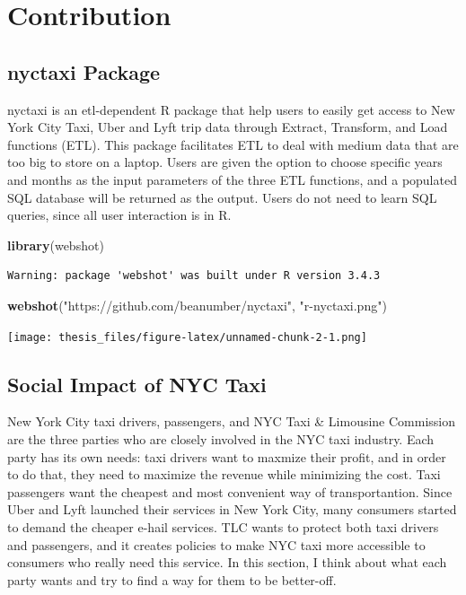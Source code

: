 \documentclass[12pt,twoside]{reedthesis}
\newenvironment{Shaded}{\begin{snugshade}}{\end{snugshade}}
\newcommand{\KeywordTok}[1]{\textcolor[rgb]{0.13,0.29,0.53}{\textbf{#1}}}
\newcommand{\StringTok}[1]{\textcolor[rgb]{0.31,0.60,0.02}{#1}}
\newcommand{\NormalTok}[1]{#1}
\theoremstyle{definition}
\theoremstyle{definition}
\theoremstyle{definition}
\theoremstyle{remark}
\begin{document}
\section{Contribution}\label{contribution}

\subsection{nyctaxi Package}\label{nyctaxi-package}

nyctaxi is an etl-dependent R package that help users to easily get
access to New York City Taxi, Uber and Lyft trip data through Extract,
Transform, and Load functions (ETL). This package facilitates ETL to
deal with medium data that are too big to store on a laptop. Users are
given the option to choose specific years and months as the input
parameters of the three ETL functions, and a populated SQL database will
be returned as the output. Users do not need to learn SQL queries, since
all user interaction is in R.
\begin{Shaded}
\begin{Highlighting}[]
\KeywordTok{library}\NormalTok{(webshot)}
\end{Highlighting}
\end{Shaded}
\begin{verbatim}
Warning: package 'webshot' was built under R version 3.4.3
\end{verbatim}
\begin{Shaded}
\begin{Highlighting}[]
\KeywordTok{webshot}\NormalTok{(}\StringTok{"https://github.com/beanumber/nyctaxi"}\NormalTok{, }\StringTok{"r-nyctaxi.png"}\NormalTok{)}
\end{Highlighting}
\end{Shaded}
\texttt{[image: thesis\_files/figure-latex/unnamed-chunk-2-1.png]}

\subsection{Social Impact of NYC Taxi}\label{social-impact-of-nyc-taxi}

New York City taxi drivers, passengers, and NYC Taxi \& Limousine
Commission are the three parties who are closely involved in the NYC
taxi industry. Each party has its own needs: taxi drivers want to
maxmize their profit, and in order to do that, they need to maximize the
revenue while minimizing the cost. Taxi passengers want the cheapest and
most convenient way of transportantion. Since Uber and Lyft launched
their services in New York City, many consumers started to demand the
cheaper e-hail services. TLC wants to protect both taxi drivers and
passengers, and it creates policies to make NYC taxi more accessible to
consumers who really need this service. In this section, I think about
what each party wants and try to find a way for them to be better-off.
\end{document}
